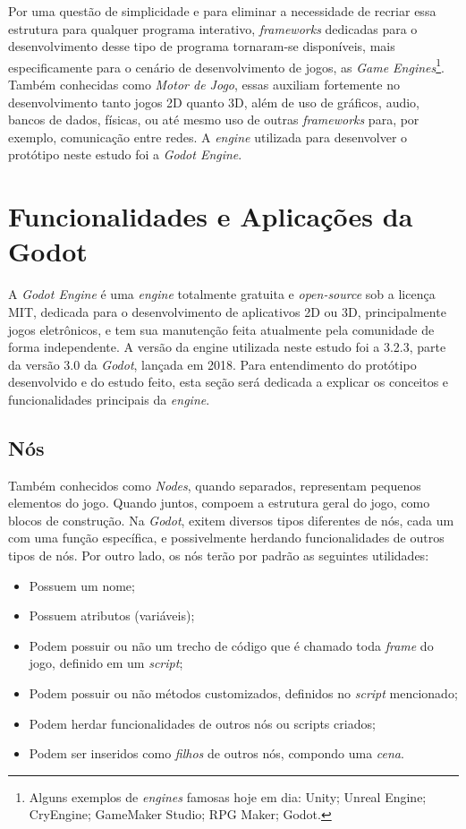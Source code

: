 Por uma questão de simplicidade e para eliminar a necessidade de recriar essa estrutura para qualquer programa interativo, \textit{frameworks} dedicadas para o desenvolvimento desse tipo de programa tornaram-se disponíveis, mais especificamente para o cenário de desenvolvimento de jogos, as \textit{Game Engines}\footnote{
    Alguns exemplos de \textit{engines} famosas hoje em dia: Unity; Unreal Engine; CryEngine; GameMaker Studio; RPG Maker; Godot.
}. Também conhecidas como \textit{Motor de Jogo}, essas auxiliam fortemente no desenvolvimento tanto jogos 2D quanto 3D, além de uso de gráficos, audio, bancos de dados, físicas, ou até mesmo uso de outras \textit{frameworks} para, por exemplo, comunicação entre redes. A \textit{engine} utilizada para desenvolver o protótipo neste estudo foi a \textit{Godot Engine}.

\section{Funcionalidades e Aplicações da Godot}

A \textit{Godot Engine} é uma \textit{engine} totalmente gratuita e \textit{open-source} sob a licença MIT, dedicada para o desenvolvimento de aplicativos 2D ou 3D, principalmente jogos eletrônicos, e tem sua manutenção feita atualmente pela comunidade de forma independente. A versão da engine utilizada neste estudo foi a 3.2.3, parte da versão 3.0 da \textit{Godot}, lançada em 2018. Para entendimento do protótipo desenvolvido e do estudo feito, esta seção será dedicada a explicar os conceitos e funcionalidades principais da \textit{engine}.

\subsection{Nós}

Também conhecidos como \textit{Nodes}, quando separados, representam pequenos elementos do jogo. Quando juntos, compoem a estrutura geral do jogo, como blocos de construção. Na \textit{Godot}, exitem diversos tipos diferentes de nós, cada um com uma função específica, e possivelmente herdando funcionalidades de outros tipos de nós. Por outro lado, os nós terão por padrão as seguintes utilidades:

\begin{itemize}
    \item Possuem um nome;
    \item Possuem atributos (variáveis);
    \item Podem possuir ou não um trecho de código que é chamado toda \textit{frame} do jogo, definido em um \textit{script};
    \item Podem possuir ou não métodos customizados, definidos no \textit{script} mencionado;
    \item Podem herdar funcionalidades de outros nós ou scripts criados;
    \item Podem ser inseridos como \textit{filhos} de outros nós, compondo uma \textit{cena}.
\end{itemize}

